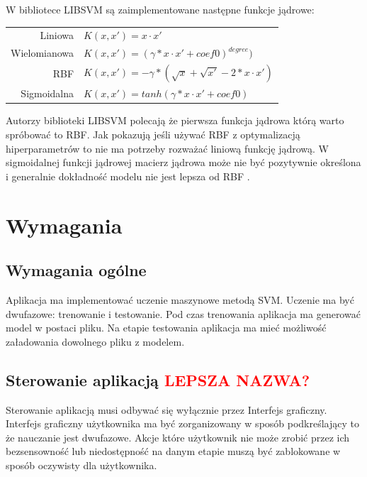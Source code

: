 \documentclass[paper=a4, fontsize=11pt]{scrartcl} %
\numberwithin{equation}{section} %
\numberwithin{figure}{section} %
\begin{document}
    \newpage 

    \par W bibliotece LIBSVM są zaimplementowane następne funkcje jądrowe:

    \begin{center}
        \begin{tabular}{rl}
            Liniowa & $K(x,x') = x\cdot x'$\\
            Wielomianowa & $K(x,x') = (\gamma*x \cdot x'+coef0)^{degree})$\\
            RBF & $K(x,x') =  -\gamma * (\sqrt{x}+\sqrt{x'}-2 * x\cdot x')$ \\
            Sigmoidalna & $K(x,x') = tanh(\gamma*x \cdot x'+coef0)$
        \end{tabular}
    \end{center}

    \par Autorzy biblioteki LIBSVM polecają \cite{hsu2003practical} że pierwsza funkcja jądrowa
    którą warto spróbować to RBF.  Jak pokazują \cite{keerthi2003asymptotic} jeśli używać RBF z
    optymalizacją hiperparametrów to nie ma potrzeby rozważać liniową funkcję jądrową. W sigmoidalnej
    funkcji jądrowej macierz jądrowa może nie być pozytywnie określona i generalnie dokładność modelu
    nie jest lepsza od RBF \cite{lin2003study}. 

\newpage
\section{Wymagania} %
\subsection{Wymagania ogólne}
    \par Aplikacja ma implementować uczenie maszynowe metodą SVM. Uczenie ma być dwufazowe:
    trenowanie i testowanie. Pod czas trenowania aplikacja ma generować model w postaci pliku.
    Na etapie testowania aplikacja ma mieć możliwość załadowania dowolnego pliku z modelem.

\subsection{Sterowanie aplikacją \textbf{\textcolor{red}{LEPSZA NAZWA?}}} %
    \par Sterowanie aplikacją musi odbywać się wyłącznie przez Interfejs graficzny. Interfejs
    graficzny użytkownika ma być zorganizowany w sposób podkreślający to że nauczanie jest
    dwufazowe. Akcje które użytkownik nie może zrobić przez ich bezsensowność lub
    niedostępność na danym etapie muszą być zablokowane w sposób oczywisty dla użytkownika.
\end{document}
